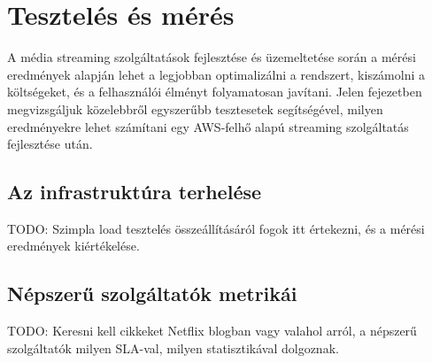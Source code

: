 \chapter{Tesztelés és mérés}

A média streaming szolgáltatások fejlesztése és üzemeltetése során a mérési eredmények alapján lehet a legjobban optimalizálni a rendszert, kiszámolni a költségeket, és a felhasználói élményt folyamatosan javítani. Jelen fejezetben megvizsgáljuk közelebbről egyszerűbb tesztesetek segítségével, milyen eredményekre lehet számítani egy AWS-felhő alapú streaming szolgáltatás fejlesztése után.

\section{Az infrastruktúra terhelése}

TODO: Szimpla load tesztelés összeállításáról fogok itt értekezni, és a mérési eredmények kiértékelése.

\section{Népszerű szolgáltatók metrikái}

TODO: Keresni kell cikkeket Netflix blogban vagy valahol arról, a népszerű szolgáltatók milyen SLA-val, milyen statisztikával dolgoznak.
